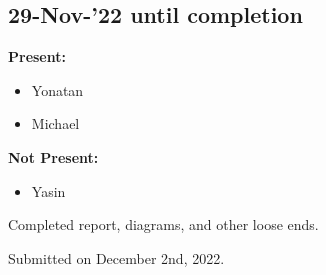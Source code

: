 \documentclass[11pt]{article}
\begin{document}
    \subsection{29-Nov-’22 until completion}\label{subsec:29-nov-22-until-completion}

    \textbf{Present:}
    \begin{itemize}
        \item Yonatan
        \item Michael
    \end{itemize}

    \textbf{Not Present:}

    \begin{itemize}
        \item Yasin
    \end{itemize}

    Completed report, diagrams, and other loose ends.

    Submitted on December 2nd, 2022.
\end{document}
